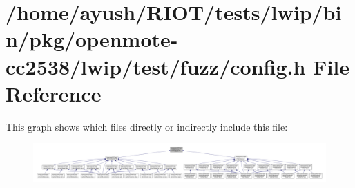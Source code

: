 \hypertarget{openmote-cc2538_2lwip_2test_2fuzz_2config_8h}{}\section{/home/ayush/\+R\+I\+O\+T/tests/lwip/bin/pkg/openmote-\/cc2538/lwip/test/fuzz/config.h File Reference}
\label{openmote-cc2538_2lwip_2test_2fuzz_2config_8h}
This graph shows which files directly or indirectly include this file\+:
\nopagebreak
\begin{figure}[H]
\begin{center}
\leavevmode
\includegraphics[width=350pt]{openmote-cc2538_2lwip_2test_2fuzz_2config_8h__dep__incl}
\end{center}
\end{figure}
